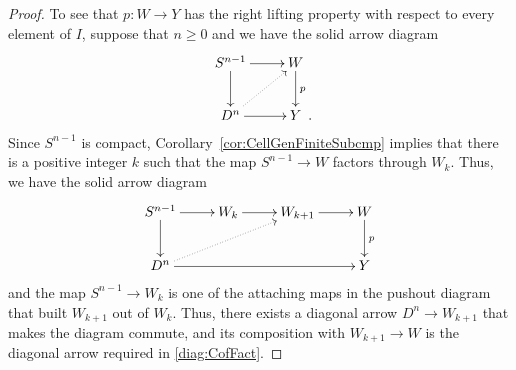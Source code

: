 \documentclass[12pt]{amsart}
\numberwithin{equation}{section}
\theoremstyle{slplain}
\theoremstyle{definition}
\theoremstyle{remark}
\newcommand{\Period}{\rlap{\enspace .}}
\begin{document}
\begin{proof}
  To see that $p\colon W \to Y$ has the right lifting property with
  respect to every element of $I$, suppose that $n \ge 0$ and we have
  the solid arrow diagram
  \begin{equation}
    \label{diag:CofFact}
    \vcenter{
      \xymatrix{
        {S^{n-1}} \ar[r] \ar[d]
        & {W} \ar[d]^{p}\\
        {D^{n}} \ar[r] \ar@{..>}[ur]
        & {Y \Period}
      }%
    }%
  \end{equation}
  Since $S^{n-1}$ is compact, Corollary~\ref{cor:CellGenFiniteSubcmp} implies
  that there is a positive integer $k$ such that the map $S^{n-1} \to
  W$ factors through $W_{k}$.  Thus, we have the solid arrow diagram
  \begin{displaymath}
    \xymatrix{
      {S^{n-1}} \ar[r] \ar[d]
      & {W_{k}} \ar[r]
      & {W_{k+1}} \ar[r]
      & {W} \ar[d]^{p}\\
      {D^{n}} \ar@{..>}[urr] \ar[rrr]
      &&& {Y}
    }%
  \end{displaymath}
  and the map $S^{n-1} \to W_{k}$ is one of the attaching maps in the
  pushout diagram that built $W_{k+1}$ out of $W_{k}$.  Thus, there
  exists a diagonal arrow $D^{n} \to W_{k+1}$ that makes the diagram
  commute, and its composition with $W_{k+1} \to W$ is the diagonal
  arrow required in \eqref{diag:CofFact}.


\end{proof}
\end{document}
